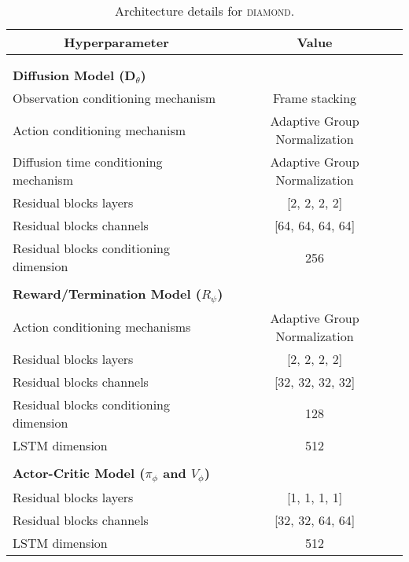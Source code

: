 \begin{table}[h!]
\caption{Architecture details for \textsc{diamond}.}
\label{tbl_architecture}
\begin{center}
\begin{tabular}{ l c }
\multicolumn{1}{c}{\textbf{Hyperparameter}}  & \multicolumn{1}{c}{\textbf{Value}} \\ 

\hline \\

\\
\multicolumn{2}{l}{\textbf{Diffusion Model ($\mathbf{D}_\theta$)}} \\
Observation conditioning mechanism & Frame stacking \\
Action conditioning mechanism & Adaptive Group Normalization \\
Diffusion time conditioning mechanism & Adaptive Group Normalization \\
Residual blocks layers & [2, 2, 2, 2] \\
Residual blocks channels & [64, 64, 64, 64] \\
Residual blocks conditioning dimension & 256 \\

\\
\multicolumn{2}{l}{\textbf{Reward/Termination Model ($R_\psi$)}} \\
Action conditioning mechanisms & Adaptive Group Normalization \\
Residual blocks layers & [2, 2, 2, 2] \\
Residual blocks channels & [32, 32, 32, 32] \\
Residual blocks conditioning dimension & 128 \\
LSTM dimension & 512 \\ 

\\
\multicolumn{2}{l}{\textbf{Actor-Critic Model ($\pi_\phi$ and $V_\phi$)}} \\
Residual blocks layers & [1, 1, 1, 1] \\
Residual blocks channels & [32, 32, 64, 64] \\
LSTM dimension & 512 \\ 


\end{tabular}
\end{center}
\end{table}
